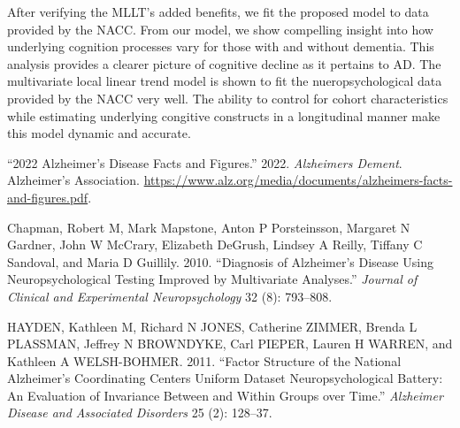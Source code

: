 \documentclass[
]{article}
\newlength{\cslhangindent}
\newlength{\cslentryspacingunit} %
\newenvironment{CSLReferences}[2] %
 {%
  \setlength{\parindent}{0pt}
  \ifodd #1
  \let\oldpar\par
  \def\par{\hangindent=\cslhangindent\oldpar}
  \fi
  \setlength{\parskip}{#2\cslentryspacingunit}
 }%
 {}
\begin{document}
After verifying the MLLT's added benefits, we fit the proposed model to data provided by the NACC. From our model, we show compelling insight into how underlying cognition processes vary for those with and without dementia. This analysis provides a clearer picture of cognitive decline as it pertains to AD. The multivariate local linear trend model is shown to fit the nueropsychological data provided by the NACC very well. The ability to control for cohort characteristics while estimating underlying congitive constructs in a longitudinal manner make this model dynamic and accurate.

\hypertarget{refs}{}
\begin{CSLReferences}{1}{0}
\leavevmode{}%
{``2022 Alzheimer's Disease Facts and Figures.''} 2022. \emph{Alzheimers Dement}. Alzheimer's Association. \url{https://www.alz.org/media/documents/alzheimers-facts-and-figures.pdf}.

\leavevmode{}%
Chapman, Robert M, Mark Mapstone, Anton P Porsteinsson, Margaret N Gardner, John W McCrary, Elizabeth DeGrush, Lindsey A Reilly, Tiffany C Sandoval, and Maria D Guillily. 2010. {``Diagnosis of Alzheimer's Disease Using Neuropsychological Testing Improved by Multivariate Analyses.''} \emph{Journal of Clinical and Experimental Neuropsychology} 32 (8): 793--808.

\leavevmode{}%
HAYDEN, Kathleen M, Richard N JONES, Catherine ZIMMER, Brenda L PLASSMAN, Jeffrey N BROWNDYKE, Carl PIEPER, Lauren H WARREN, and Kathleen A WELSH-BOHMER. 2011. {``Factor Structure of the National Alzheimer's Coordinating Centers Uniform Dataset Neuropsychological Battery: An Evaluation of Invariance Between and Within Groups over Time.''} \emph{Alzheimer Disease and Associated Disorders} 25 (2): 128--37.

\end{CSLReferences}
\end{document}
